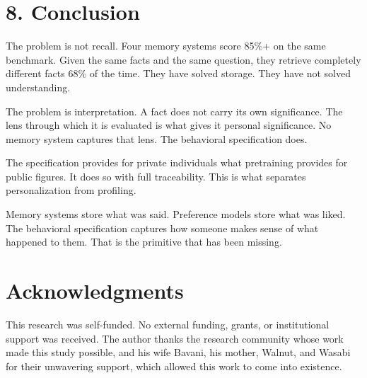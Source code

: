 \documentclass[11pt,a4paper]{article}
\begin{document}
\section{8. Conclusion}

The problem is not recall. Four memory systems score 85\%+ on the same benchmark. Given the
same facts and the same question, they retrieve completely different facts 68\% of the time.
They have solved storage. They have not solved understanding.

The problem is interpretation. A fact does not carry its own significance. The lens through
which it is evaluated is what gives it personal significance. No memory system captures that
lens. The behavioral specification does.

The specification provides for private individuals what pretraining provides for public
figures. It does so with full traceability. This is what separates personalization from
profiling.

Memory systems store what was said. Preference models store what was liked. The behavioral
specification captures how someone makes sense of what happened to them. That is the
primitive that has been missing.

\section*{Acknowledgments}

This research was self-funded. No external funding, grants, or institutional support was
received. The author thanks the research community whose work made this study possible,
and his wife Bavani, his mother, Walnut, and Wasabi for their unwavering support, which
allowed this work to come into existence.
\end{document}
